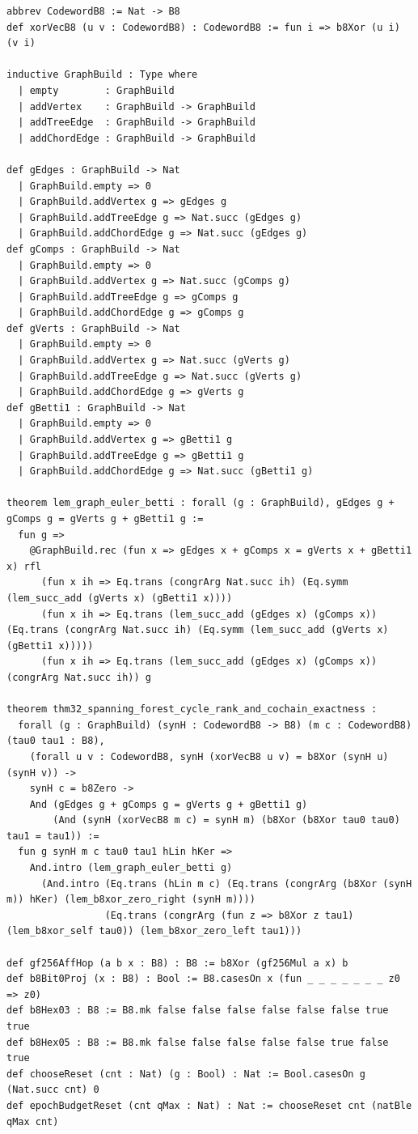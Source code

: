 \documentclass[11pt,letterpaper]{article}
\theoremstyle{spectralthm}
\begin{document}
\begin{lstlisting}[language=Lean4,caption={Standalone Pure Init.Prelude Term-Mode Lean 4 Kernel Suite (thm30--thm61, v0.0.0, 0 sorry, 0 axioms).},label={lst:lean_unified}]
abbrev CodewordB8 := Nat -> B8
def xorVecB8 (u v : CodewordB8) : CodewordB8 := fun i => b8Xor (u i) (v i)

inductive GraphBuild : Type where
  | empty        : GraphBuild
  | addVertex    : GraphBuild -> GraphBuild
  | addTreeEdge  : GraphBuild -> GraphBuild
  | addChordEdge : GraphBuild -> GraphBuild

def gEdges : GraphBuild -> Nat
  | GraphBuild.empty => 0
  | GraphBuild.addVertex g => gEdges g
  | GraphBuild.addTreeEdge g => Nat.succ (gEdges g)
  | GraphBuild.addChordEdge g => Nat.succ (gEdges g)
def gComps : GraphBuild -> Nat
  | GraphBuild.empty => 0
  | GraphBuild.addVertex g => Nat.succ (gComps g)
  | GraphBuild.addTreeEdge g => gComps g
  | GraphBuild.addChordEdge g => gComps g
def gVerts : GraphBuild -> Nat
  | GraphBuild.empty => 0
  | GraphBuild.addVertex g => Nat.succ (gVerts g)
  | GraphBuild.addTreeEdge g => Nat.succ (gVerts g)
  | GraphBuild.addChordEdge g => gVerts g
def gBetti1 : GraphBuild -> Nat
  | GraphBuild.empty => 0
  | GraphBuild.addVertex g => gBetti1 g
  | GraphBuild.addTreeEdge g => gBetti1 g
  | GraphBuild.addChordEdge g => Nat.succ (gBetti1 g)

theorem lem_graph_euler_betti : forall (g : GraphBuild), gEdges g + gComps g = gVerts g + gBetti1 g :=
  fun g =>
    @GraphBuild.rec (fun x => gEdges x + gComps x = gVerts x + gBetti1 x) rfl
      (fun x ih => Eq.trans (congrArg Nat.succ ih) (Eq.symm (lem_succ_add (gVerts x) (gBetti1 x))))
      (fun x ih => Eq.trans (lem_succ_add (gEdges x) (gComps x)) (Eq.trans (congrArg Nat.succ ih) (Eq.symm (lem_succ_add (gVerts x) (gBetti1 x)))))
      (fun x ih => Eq.trans (lem_succ_add (gEdges x) (gComps x)) (congrArg Nat.succ ih)) g

theorem thm32_spanning_forest_cycle_rank_and_cochain_exactness :
  forall (g : GraphBuild) (synH : CodewordB8 -> B8) (m c : CodewordB8) (tau0 tau1 : B8),
    (forall u v : CodewordB8, synH (xorVecB8 u v) = b8Xor (synH u) (synH v)) ->
    synH c = b8Zero ->
    And (gEdges g + gComps g = gVerts g + gBetti1 g)
        (And (synH (xorVecB8 m c) = synH m) (b8Xor (b8Xor tau0 tau0) tau1 = tau1)) :=
  fun g synH m c tau0 tau1 hLin hKer =>
    And.intro (lem_graph_euler_betti g)
      (And.intro (Eq.trans (hLin m c) (Eq.trans (congrArg (b8Xor (synH m)) hKer) (lem_b8xor_zero_right (synH m))))
                 (Eq.trans (congrArg (fun z => b8Xor z tau1) (lem_b8xor_self tau0)) (lem_b8xor_zero_left tau1)))

def gf256AffHop (a b x : B8) : B8 := b8Xor (gf256Mul a x) b
def b8Bit0Proj (x : B8) : Bool := B8.casesOn x (fun _ _ _ _ _ _ _ z0 => z0)
def b8Hex03 : B8 := B8.mk false false false false false false true true
def b8Hex05 : B8 := B8.mk false false false false false true false true
def chooseReset (cnt : Nat) (g : Bool) : Nat := Bool.casesOn g (Nat.succ cnt) 0
def epochBudgetReset (cnt qMax : Nat) : Nat := chooseReset cnt (natBle qMax cnt)


\end{lstlisting}
\end{document}
